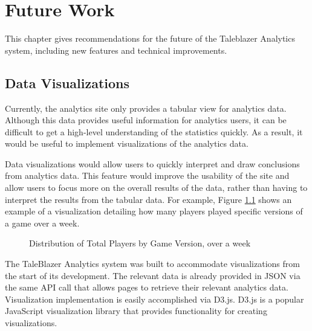 \chapter{Future Work}

This chapter gives recommendations for the future of the Taleblazer Analytics system, including new features and technical improvements. 

\section{Data Visualizations}

Currently, the analytics site only provides a tabular view for analytics data. Although this data provides useful information for analytics users, it can be difficult to get a high-level understanding of the statistics quickly. As a result, it would be useful to implement visualizations of the analytics data. 

Data visualizations would allow users to quickly interpret and draw conclusions from analytics data. This feature would improve the usability of the site and allow users to focus more on the overall results of the data, rather than having to interpret the results from the tabular data. For example, Figure \ref{fig:num_completed_viz} shows an example of a visualization detailing how many players played specific versions of a game over a week. 

\begin{figure}[hbt]
	\caption[Example Data Visualization]{\label{fig:num_completed_viz} Distribution of Total Players by Game Version, over a week}
\end{figure}

The TaleBlazer Analytics system was built to accommodate visualizations from the start of its development. The relevant data is already provided in JSON via the same API call that allows pages to retrieve their relevant analytics data. Visualization implementation is easily accomplished via D3.js. D3.js is a popular JavaScript visualization library that provides functionality for creating visualizations. 


